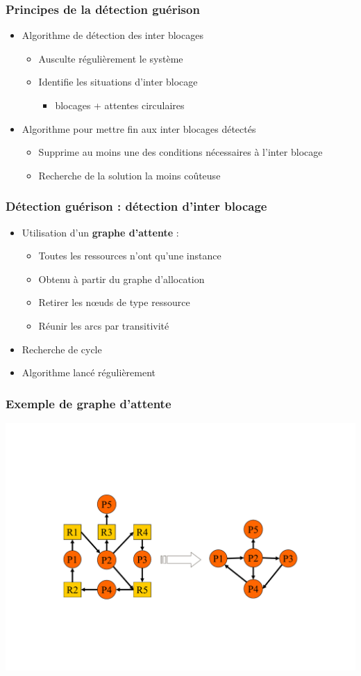 \begin{frame}
\frametitle{Principes de la \textbf{détection guérison}}
\begin{itemize}
\item <1-> [détection] Algorithme de détection des inter blocages
\begin{itemize}
\item Ausculte régulièrement le système
\item Identifie les situations d’inter blocage
\begin{itemize}
\item blocages + attentes circulaires
\end{itemize}
\end{itemize}
\item <2-> [guérison] Algorithme pour mettre fin aux inter blocages détectés
\begin{itemize}
\item Supprime au moins une des conditions nécessaires à l’inter blocage
\item Recherche de la solution la moins coûteuse
\end{itemize}
\end{itemize}
\end{frame}

\begin{frame}
\frametitle{Détection guérison : détection d’inter blocage}
\begin{itemize}
\item Utilisation d’un \textbf{graphe d’attente} :
\begin{itemize}
\item Toutes les ressources n’ont qu’une instance
\item Obtenu à partir du graphe d’allocation
\item Retirer les nœuds de type ressource
\item Réunir les arcs par transitivité
\end{itemize}
\item Recherche de cycle
\item Algorithme lancé régulièrement
\end{itemize}
\end{frame}

\begin{frame}
\frametitle{Exemple de graphe d’attente}
\includegraphics[width=.9\textwidth]{../illustration/gar2ga.pdf}
\end{frame}

